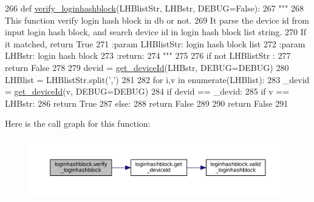 \begin{DoxyCode}
266 \textcolor{keyword}{def }\hyperlink{namespaceloginhashblock_aa5bb94484a68d0bbebce23b4cfeeb4b7}{verify\_loginhashblock}(LHBlistStr, LHBstr, DEBUG=False):
267     \textcolor{stringliteral}{"""}
268 \textcolor{stringliteral}{    This function verify login hash block in db or not. }
269 \textcolor{stringliteral}{    It parse the device id from input login hash block, and search device id in login hash block list
       string. }
270 \textcolor{stringliteral}{    If it matched, return True}
271 \textcolor{stringliteral}{    :param LHBlistStr: login hash block list}
272 \textcolor{stringliteral}{    :param LHBstr: login hash block}
273 \textcolor{stringliteral}{    :return:}
274 \textcolor{stringliteral}{    """}
275 
276     \textcolor{keywordflow}{if} \textcolor{keywordflow}{not} LHBlistStr :
277         \textcolor{keywordflow}{return} \textcolor{keyword}{False}
278 
279     devid = \hyperlink{namespaceloginhashblock_a17417f2f6bca76ab51170082a562e5f6}{get\_deviceId}(LHBstr, DEBUG=DEBUG)
280     LHBlist = LHBlistStr.split(\textcolor{stringliteral}{','})
281 
282     \textcolor{keywordflow}{for} i,v \textcolor{keywordflow}{in} enumerate(LHBlist):
283         \_devid = \hyperlink{namespaceloginhashblock_a17417f2f6bca76ab51170082a562e5f6}{get\_deviceId}(v, DEBUG=DEBUG)
284         \textcolor{keywordflow}{if} devid == \_devid:
285             \textcolor{keywordflow}{if} v == LHBstr:
286                 \textcolor{keywordflow}{return} \textcolor{keyword}{True}
287             \textcolor{keywordflow}{else}:
288                 \textcolor{keywordflow}{return} \textcolor{keyword}{False}
289 
290     \textcolor{keywordflow}{return} \textcolor{keyword}{False}
291 
\end{DoxyCode}


Here is the call graph for this function\+:\nopagebreak
\begin{figure}[H]
\begin{center}
\leavevmode
\includegraphics[width=350pt]{namespaceloginhashblock_aa5bb94484a68d0bbebce23b4cfeeb4b7_cgraph}
\end{center}
\end{figure}




